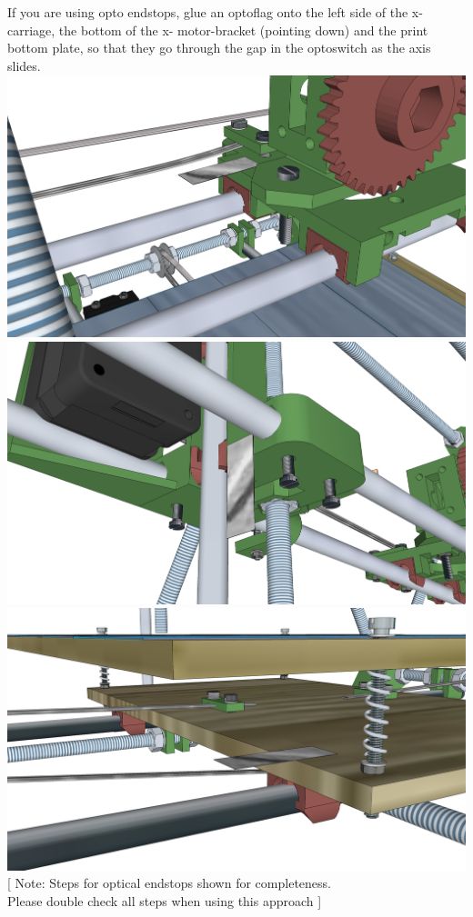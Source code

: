 \documentclass[twoside,openany,a4paper,titlepage]{memoir}
\begin{document}
	\section{}
	If you are using opto endstops, glue an optoflag onto the left side of the x-carriage, the bottom of the x-
	motor-bracket (pointing down) and the print bottom plate, so that they go through the gap in the
	optoswitch as the axis slides.\\
	\includegraphics[width=1\linewidth]{graphics/ch10_6_1.png}
	\includegraphics[width=1\linewidth]{graphics/ch10_6_2.png}
	\includegraphics[width=1\linewidth]{graphics/ch10_6_3.png}	
	[ Note: Steps for optical endstops shown for completeness. \\
	Please double check all steps when using this approach ]
	
\end{document}
